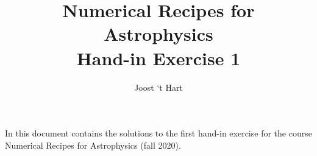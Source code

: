 \documentclass[a4paper,10pt]{article}
\title{Numerical Recipes for Astrophysics \\Hand-in Exercise 1}
\author{Joost `t Hart}
\begin{document}
\maketitle
In this document contains the solutions to the first hand-in exercise for the course Numerical Recipes for Astrophysics (fall 2020). 







% 

% 
\end{document}
